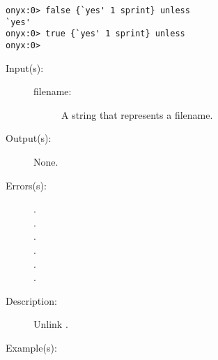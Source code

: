 \begin{description}
\begin{description}
\begin{verbatim}
onyx:0> false {`yes' 1 sprint} unless
`yes'
onyx:0> true {`yes' 1 sprint} unless
onyx:0>
		\end{verbatim}
	\end{description}
\label{systemdict:unlink}
\item[{\onyxop{filename}{unlink}{--}}: ]
	\begin{description}\item[]
	\item[Input(s): ]
		\begin{description}\item[]
		\item[filename: ]
			A string that represents a filename.
		\end{description}
	\item[Output(s): ] None.
	\item[Errors(s): ]
		\begin{description}\item[]
		\item[.]
		\item[.]
		\item[.]
		\item[.]
		\item[.]
		\item[.]
		\end{description}
	\item[Description: ]
		Unlink .
	\item[Example(s): ]\begin{verbatim}


\end{verbatim}
\end{description}
\end{description}
